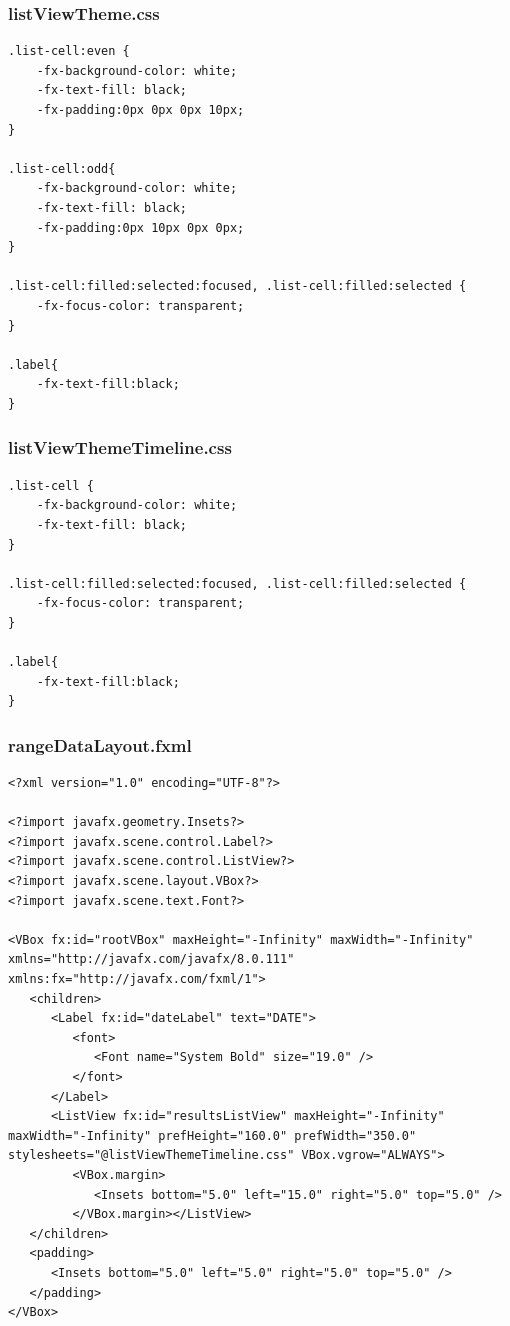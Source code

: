 \subsubsection{listViewTheme.css}
\begin{lstlisting}
.list-cell:even {
    -fx-background-color: white;
    -fx-text-fill: black;
    -fx-padding:0px 0px 0px 10px;
}

.list-cell:odd{
    -fx-background-color: white;
    -fx-text-fill: black;
    -fx-padding:0px 10px 0px 0px;
}

.list-cell:filled:selected:focused, .list-cell:filled:selected {
    -fx-focus-color: transparent;
}

.label{
    -fx-text-fill:black;
}
\end{lstlisting}
\subsubsection{listViewThemeTimeline.css}
\begin{lstlisting}
.list-cell {
    -fx-background-color: white;
    -fx-text-fill: black;
}

.list-cell:filled:selected:focused, .list-cell:filled:selected {
    -fx-focus-color: transparent;
}

.label{
    -fx-text-fill:black;
}
\end{lstlisting}
\subsubsection{rangeDataLayout.fxml}
\begin{lstlisting}
<?xml version="1.0" encoding="UTF-8"?>

<?import javafx.geometry.Insets?>
<?import javafx.scene.control.Label?>
<?import javafx.scene.control.ListView?>
<?import javafx.scene.layout.VBox?>
<?import javafx.scene.text.Font?>

<VBox fx:id="rootVBox" maxHeight="-Infinity" maxWidth="-Infinity" xmlns="http://javafx.com/javafx/8.0.111" xmlns:fx="http://javafx.com/fxml/1">
   <children>
      <Label fx:id="dateLabel" text="DATE">
         <font>
            <Font name="System Bold" size="19.0" />
         </font>
      </Label>
      <ListView fx:id="resultsListView" maxHeight="-Infinity" maxWidth="-Infinity" prefHeight="160.0" prefWidth="350.0" stylesheets="@listViewThemeTimeline.css" VBox.vgrow="ALWAYS">
         <VBox.margin>
            <Insets bottom="5.0" left="15.0" right="5.0" top="5.0" />
         </VBox.margin></ListView>
   </children>
   <padding>
      <Insets bottom="5.0" left="5.0" right="5.0" top="5.0" />
   </padding>
</VBox>
\end{lstlisting}
